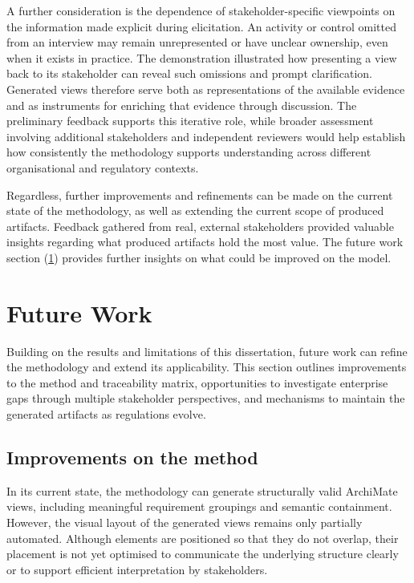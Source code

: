 A further consideration is the dependence of stakeholder-specific viewpoints on the information made explicit during elicitation. An activity or control omitted from an interview may remain unrepresented or have unclear ownership, even when it exists in practice. The demonstration illustrated how presenting a view back to its stakeholder can reveal such omissions and prompt clarification. Generated views therefore serve both as representations of the available evidence and as instruments for enriching that evidence through discussion. The preliminary feedback supports this iterative role, while broader assessment involving additional stakeholders and independent reviewers would help establish how consistently the methodology supports understanding across different organisational and regulatory contexts.

Regardless, further improvements and refinements can be made on the current state of the methodology, as well as extending the current scope of produced artifacts. Feedback gathered from real, external stakeholders provided valuable insights regarding what produced artifacts hold the most value. The future work section (\ref{FWork}) provides further insights on what could be improved on the model.

\section{Future Work}
\label{FWork}

Building on the results and limitations of this dissertation, future work can refine the methodology and extend its applicability. This section outlines improvements to the method and traceability matrix, opportunities to investigate enterprise gaps through multiple stakeholder perspectives, and mechanisms to maintain the generated artifacts as regulations evolve.

\subsection{Improvements on the method}

In its current state, the methodology can generate structurally valid ArchiMate views, including meaningful requirement groupings and semantic containment. However, the visual layout of the generated views remains only partially automated. Although elements are positioned so that they do not overlap, their placement is not yet optimised to communicate the underlying structure clearly or to support efficient interpretation by stakeholders.


